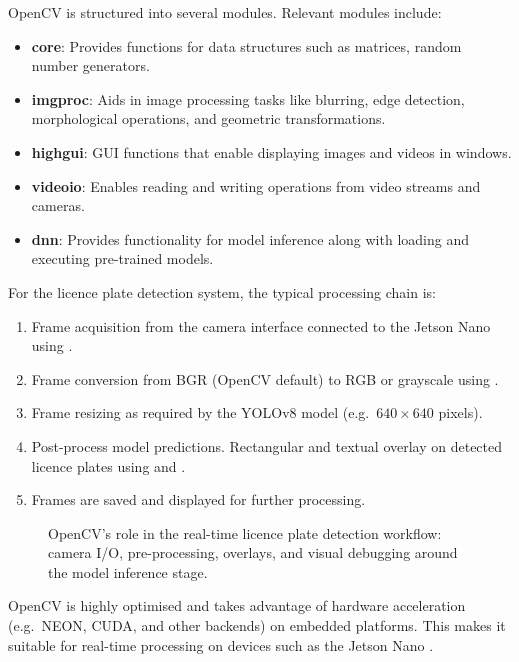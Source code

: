 OpenCV is structured into several modules. Relevant modules include:
\begin{itemize}
	\item \textbf{core}: Provides functions for data structures such as matrices, random number generators.
	\item \textbf{imgproc}: Aids in image processing tasks like blurring, edge detection, morphological operations, and geometric transformations.
	\item \textbf{highgui}: GUI functions that enable displaying images and videos in windows.
	\item \textbf{videoio}: Enables reading and writing operations from video streams and cameras.
	\item \textbf{dnn}: Provides functionality for model inference along with loading and executing pre-trained models.
\end{itemize}

For the licence plate detection system, the typical processing chain is:
\begin{enumerate}
	\item Frame acquisition from the camera interface connected to the Jetson Nano using .
	\item Frame conversion from BGR (OpenCV default) to RGB or grayscale using .
	\item Frame resizing as required by the YOLOv8 model (e.g.\ $640 \times 640$ pixels).
	\item Post-process model predictions. Rectangular and textual overlay on detected licence plates using  and .
	\item Frames are saved and displayed for further processing.
\end{enumerate}

\begin{figure}[htbp]
	\centering
	
	\caption{OpenCV's role in the real-time licence plate detection workflow: camera I/O, pre-processing, overlays, and visual debugging around the model inference stage.}
	\label{fig:opencv_pipeline}
\end{figure}

OpenCV is highly optimised and takes advantage of hardware acceleration (e.g.\ NEON, CUDA, and other backends) on embedded platforms. This makes it suitable for real-time processing on devices such as the Jetson Nano \cite{opencv_lfs,opencv_on_wheels}.


